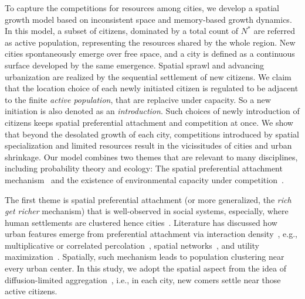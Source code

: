 \documentclass[reprint,unsortedaddress,amsmath,amssymb,aps,prl,showkeys]{revtex4-2}
\begin{document}
To capture the competitions for resources among cities, we develop a spatial growth model based on inconsistent space and memory-based growth dynamics. In this model, a subset of citizens, dominated by a total count of $N^*$ are referred as active population, representing the resources shared by the whole region. New cities spontaneously emerge over free space, and a city is defined as a continuous surface developed by the same emergence. Spatial sprawl and advancing urbanization are realized by the sequential settlement of new citizens. We claim that the location choice of each newly initiated citizen is regulated to be adjacent to the finite \textit{active population}, that are replacive under capacity. So a new initiation is also denoted as an \textit{introduction}. Such choices of newly introduction of citizens keeps spatial preferential attachment and competition at once. We show that beyond the desolated growth of each city, competitions introduced by spatial specialization and limited resources result in the vicissitudes of cities and urban shrinkage. Our model combines two themes that are relevant to many disciplines, including probability theory and ecology: The spatial preferential attachment mechanism~\cite{Li2017Simple} and the existence of environmental capacity under competition~\cite{gude2020bacterial,liu2019an}. 

The first theme is spatial preferential attachment (or more generalized, the \textit{rich get richer} mechanism) that is well-observed in social systems, especially, where human settlements are clustered hence cities~\cite{marsili1998interacting}. Literature has discussed how urban features emerge from preferential attachment via interaction density~\cite{ccolak2016understanding,louf2014congestion,fujita1976spatial}, e.g., multiplicative or correlated percolation~\cite{makse1995modelling,PhysRevE.58.7054,rybski2013distance}, spatial networks~\cite{marsili1998interacting,court2013origins,Li2017Simple}, and utility maximization~\cite{PhysRevE.90.042815,axtell2001emergent}. Spatially, such mechanism leads to population clustering near every urban center. In this study, we adopt the spatial aspect from the idea of diffusion-limited aggregation~\cite{makse1995modelling, rybski2013distance, kleinberg2000navigation}, i.e., in each city, new comers settle near those active citizens.
\end{document}
